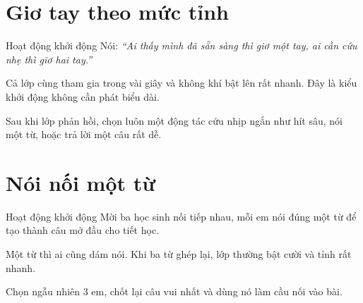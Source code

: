 \section{Giơ tay theo mức tỉnh}
\begin{khoidongbox}{Hoạt động khởi động}
Nói: \textit{``Ai thấy mình đã sẵn sàng thì giơ một tay, ai cần cứu nhẹ thì giơ hai tay.''}
\end{khoidongbox}
\begin{visaohieuqua}
Cả lớp cùng tham gia trong vài giây và không khí bật lên rất nhanh. Đây là kiểu khởi động không cần phát biểu dài.
\end{visaohieuqua}
\begin{cachlam5phut}
Sau khi lớp phản hồi, chọn luôn một động tác cứu nhịp ngắn như hít sâu, nói một từ, hoặc trả lời một câu rất dễ.
\end{cachlam5phut}
\ngancach

\section{Nói nối một từ}
\begin{khoidongbox}{Hoạt động khởi động}
Mời ba học sinh nối tiếp nhau, mỗi em nói đúng một từ để tạo thành câu mở đầu cho tiết học.
\end{khoidongbox}
\begin{visaohieuqua}
Một từ thì ai cũng dám nói. Khi ba từ ghép lại, lớp thường bật cười và tỉnh rất nhanh.
\end{visaohieuqua}
\begin{cachlam5phut}
Chọn ngẫu nhiên 3 em, chốt lại câu vui nhất và dùng nó làm cầu nối vào bài.
\end{cachlam5phut}